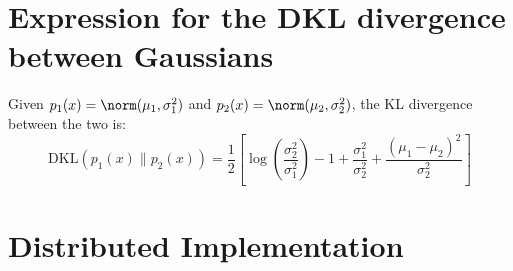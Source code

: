 \section{Expression for the DKL divergence between Gaussians}

Given $p_1(x) = \norm(\mu_1, \sigma^2_1)$ and $p_2(x) = \norm(\mu_2, \sigma^2_2)$, the KL divergence between the two is:
$$
\mathrm{DKL}\left(p_1(x) \| p_2(x)\right) = \frac{1}{2} 
\left[
\log\left(\frac{\sigma^2_2}{\sigma^2_1}\right) 
-1 
+ \frac{\sigma^2_1}{\sigma^2_2}
+ \frac{(\mu_1 - \mu_2)^2}{\sigma^2_2}
\right]
$$ 


\section{Distributed Implementation}



